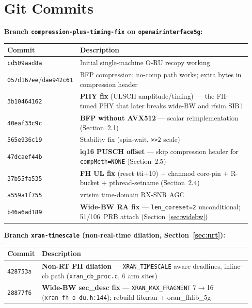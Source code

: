 \documentclass[11pt,a4paper]{article}
\begin{document}
\appendix

\section{Git Commits}

\textbf{Branch \texttt{compression-plus-timing-fix} on \texttt{openairinterface5g}:}

\begin{table}[h]\centering\small
\begin{tabularx}{\linewidth}{@{}l X@{}}
\toprule
\textbf{Commit} & \textbf{Description} \\
\midrule
\texttt{cd509aad8a} & Initial single-machine O-RU recopy working \\
\texttt{057d167ee}/\texttt{dae942c61} & BFP compression; no-comp path works; extra bytes in compression header \\
\texttt{3b10464162} & \textbf{PHY fix} (ULSCH amplitude/timing) --- the FH-tuned PHY that later breaks wide-BW and rfsim SIB1 \\
\texttt{40eaf33c9c} & \textbf{BFP without AVX512} --- scalar reimplementation (Section~2.1) \\
\texttt{565e936c19} & Stability fix (spin-wait, \texttt{>{}>2} scale) \\
\texttt{47dcaef44b} & \textbf{iq16 PUSCH offset} --- skip compression header for \texttt{compMeth=NONE} (Section~2.5) \\
\texttt{37b55fa535} & \textbf{FH UL fix} (reset tti+10) + chanmod core-pin + R-bucket + pthread-setname (Section~2.4) \\
\texttt{a559a1f755} & vrtsim time-domain RX-SNR AGC \\
\texttt{b46a6ad189} & \textbf{Wide-BW RA fix} --- \texttt{len\_coreset=2} unconditional; 51/106~PRB attach (Section~\ref{sec:widebw}) \\
\bottomrule
\end{tabularx}
\end{table}

\textbf{Branch \texttt{xran-timescale} (non-real-time dilation, Section~\ref{sec:nrt}):}

\begin{table}[h]\centering\small
\begin{tabularx}{\linewidth}{@{}l X@{}}
\toprule
\textbf{Commit} & \textbf{Description} \\
\midrule
\texttt{428753a} & \textbf{Non-RT FH dilation} --- \texttt{XRAN\_TIMESCALE}-aware deadlines, inline-cb path (\texttt{xran\_cb\_proc.c}, 6 arm sites) \\
\texttt{28877f6} & \textbf{Wide-BW sec\_desc fix} --- \texttt{XRAN\_MAX\_FRAGMENT} 7$\rightarrow$16 (\texttt{xran\_fh\_o\_du.h:144}); rebuild libxran + oran\_fhlib\_5g \\
\bottomrule
\end{tabularx}
\end{table}
\end{document}
